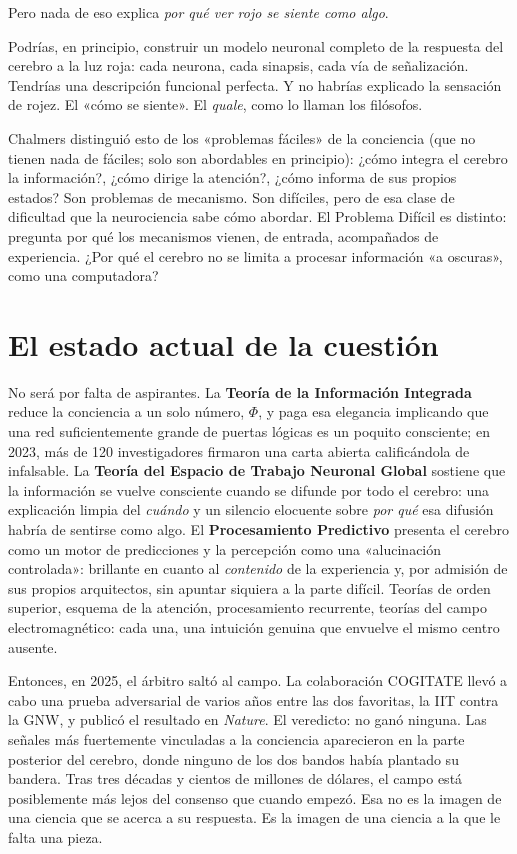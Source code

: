 \documentclass[11pt, twoside, openright]{book}
\begin{document}
Pero nada de eso explica \textit{por qué ver rojo se siente como algo}.

Podrías, en principio, construir un modelo neuronal completo de la respuesta del cerebro a la luz roja: cada neurona, cada sinapsis, cada vía de señalización. Tendrías una descripción funcional perfecta. Y no habrías explicado la sensación de rojez. El «cómo se siente». El \textit{quale}, como lo llaman los filósofos.

Chalmers distinguió esto de los «problemas fáciles» de la conciencia (que no tienen nada de fáciles; solo son abordables en principio): ¿cómo integra el cerebro la información?, ¿cómo dirige la atención?, ¿cómo informa de sus propios estados? Son problemas de mecanismo. Son difíciles, pero de esa clase de dificultad que la neurociencia sabe cómo abordar. El Problema Difícil es distinto: pregunta por qué los mecanismos vienen, de entrada, acompañados de experiencia. ¿Por qué el cerebro no se limita a procesar información «a oscuras», como una computadora?

\section*{El estado actual de la cuestión}

No será por falta de aspirantes. La \textbf{Teoría de la Información Integrada} reduce la conciencia a un solo número, $\Phi$, y paga esa elegancia implicando que una red suficientemente grande de puertas lógicas es un poquito consciente; en 2023, más de 120 investigadores firmaron una carta abierta calificándola de infalsable. La \textbf{Teoría del Espacio de Trabajo Neuronal Global} sostiene que la información se vuelve consciente cuando se difunde por todo el cerebro: una explicación limpia del \textit{cuándo} y un silencio elocuente sobre \textit{por qué} esa difusión habría de sentirse como algo. El \textbf{Procesamiento Predictivo} presenta el cerebro como un motor de predicciones y la percepción como una «alucinación controlada»: brillante en cuanto al \textit{contenido} de la experiencia y, por admisión de sus propios arquitectos, sin apuntar siquiera a la parte difícil. Teorías de orden superior, esquema de la atención, procesamiento recurrente, teorías del campo electromagnético: cada una, una intuición genuina que envuelve el mismo centro ausente.

Entonces, en 2025, el árbitro saltó al campo. La colaboración COGITATE llevó a cabo una prueba adversarial de varios años entre las dos favoritas, la IIT contra la GNW, y publicó el resultado en \textit{Nature}. El veredicto: no ganó ninguna. Las señales más fuertemente vinculadas a la conciencia aparecieron en la parte posterior del cerebro, donde ninguno de los dos bandos había plantado su bandera. Tras tres décadas y cientos de millones de dólares, el campo está posiblemente más lejos del consenso que cuando empezó. Esa no es la imagen de una ciencia que se acerca a su respuesta. Es la imagen de una ciencia a la que le falta una pieza.
\end{document}
